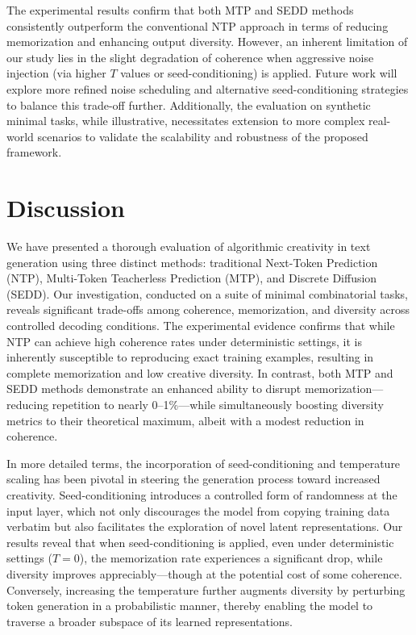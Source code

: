 \documentclass[11pt]{article}
\begin{document}
The experimental results confirm that both MTP and SEDD methods consistently outperform the conventional NTP approach in terms of reducing memorization and enhancing output diversity. However, an inherent limitation of our study lies in the slight degradation of coherence when aggressive noise injection (via higher \(T\) values or seed-conditioning) is applied. Future work will explore more refined noise scheduling and alternative seed-conditioning strategies to balance this trade-off further. Additionally, the evaluation on synthetic minimal tasks, while illustrative, necessitates extension to more complex real-world scenarios to validate the scalability and robustness of the proposed framework.

\section{Discussion}
We have presented a thorough evaluation of algorithmic creativity in text generation using three distinct methods: traditional Next-Token Prediction (NTP), Multi-Token Teacherless Prediction (MTP), and Discrete Diffusion (SEDD). Our investigation, conducted on a suite of minimal combinatorial tasks, reveals significant trade-offs among coherence, memorization, and diversity across controlled decoding conditions. The experimental evidence confirms that while NTP can achieve high coherence rates under deterministic settings, it is inherently susceptible to reproducing exact training examples, resulting in complete memorization and low creative diversity. In contrast, both MTP and SEDD methods demonstrate an enhanced ability to disrupt memorization—reducing repetition to nearly 0–1\%—while simultaneously boosting diversity metrics to their theoretical maximum, albeit with a modest reduction in coherence.

In more detailed terms, the incorporation of seed-conditioning and temperature scaling has been pivotal in steering the generation process toward increased creativity. Seed-conditioning introduces a controlled form of randomness at the input layer, which not only discourages the model from copying training data verbatim but also facilitates the exploration of novel latent representations. Our results reveal that when seed-conditioning is applied, even under deterministic settings (\(T=0\)), the memorization rate experiences a significant drop, while diversity improves appreciably—though at the potential cost of some coherence. Conversely, increasing the temperature further augments diversity by perturbing token generation in a probabilistic manner, thereby enabling the model to traverse a broader subspace of its learned representations.
\end{document}
